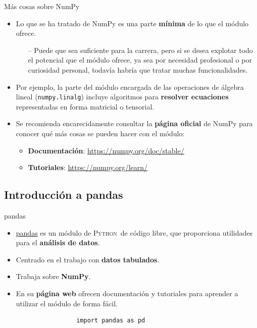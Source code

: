 \documentclass[10pt]{beamer} %
\newcommand{\py}{\textsc{Python}}
\begin{document}
\begin{frame}{Más cosas sobre NumPy}
    \begin{itemize}
        \item Lo que se ha tratado de NumPy es una parte \textbf{mínima} de lo que el módulo ofrece.
        \begin{itemize}
            \item[--] Puede que sea suficiente para la carrera, pero si se desea explotar todo el potencial que el módulo ofrece, ya sea por necesidad profesional o por curiosidad personal, todavía habría que tratar muchas funcionalidades.
        \end{itemize}
        \item Por ejemplo, la parte del módulo encargada de las operaciones de álgebra lineal (\texttt{numpy.linalg}) incluye algoritmos para \textbf{resolver ecuaciones} representadas en forma matricial o tensorial.
        \item Se recomienda encarecidamente consultar la \textbf{página oficial} de NumPy para conocer qué más cosas se pueden hacer con el módulo:
        \begin{itemize}
            \item \textbf{Documentación}: \underline{\url{https://numpy.org/doc/stable/}}
            \item \textbf{Tutoriales}: \underline{\url{https://numpy.org/learn/}}
        \end{itemize}
    \end{itemize}
\end{frame}

\subsection{Introducción a pandas}
\begin{frame}[fragile]{pandas}
    \begin{itemize}
        \item \href{https://pandas.pydata.org/}{\underline{pandas}} es un módulo de \py\, de código libre, que proporciona utilidades para el \textbf{análisis de datos}.
        \item Centrado en el trabajo con \textbf{datos tabulados}.
        \item Trabaja sobre \textbf{NumPy}.
        \item En su \textbf{página web} ofrecen documentación y tutoriales para aprender a utilizar el módulo de forma fácil.
    \end{itemize}
    \vspace{10pt}
    \begin{verbatim}
                    import pandas as pd
    \end{verbatim}
\end{frame}
\end{document}
